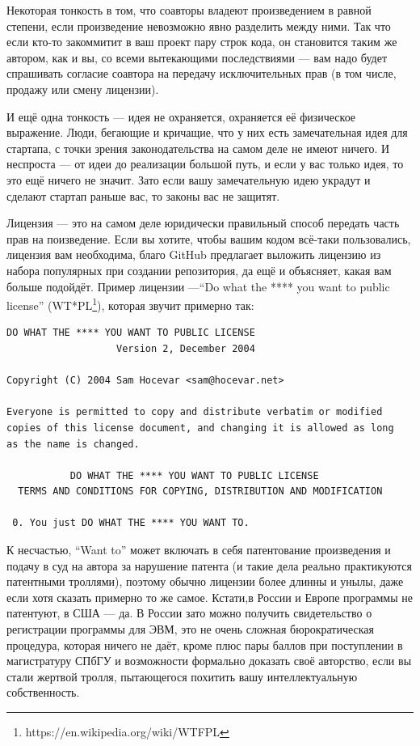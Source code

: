 \documentclass[a5paper]{article}
\begin{document}
Некоторая тонкость в том, что соавторы владеют произведением в равной степени, если произведение невозможно явно разделить между ними. Так что если кто-то закоммитит в ваш проект пару строк кода, он становится таким же автором, как и вы, со всеми вытекающими последствиями --- вам надо будет спрашивать согласие соавтора на передачу исключительных прав (в том числе, продажу или смену лицензии).

И ещё одна тонкость --- идея не охраняется, охраняется её физическое выражение. Люди, бегающие и кричащие, что у них есть замечательная идея для стартапа, с точки зрения законодательства на самом деле не имеют ничего. И неспроста --- от идеи до реализации большой путь, и если у вас только идея, то это ещё ничего не значит. Зато если вашу замечательную идею украдут и сделают стартап раньше вас, то законы вас не защитят.

Лицензия --- это на самом деле юридически правильный способ передать часть прав на поизведение. Если вы хотите, чтобы вашим кодом всё-таки пользовались, лицензия вам необходима, благо GitHub предлагает выложить лицензию из набора популярных при создании репозитория, да ещё и объясняет, какая вам больше подойдёт. Пример лицензии ---``Do what the **** you want to public license'' (WT*PL\footnote{https://en.wikipedia.org/wiki/WTFPL}), которая звучит примерно так:
\begin{verbatim}
DO WHAT THE **** YOU WANT TO PUBLIC LICENSE
                   Version 2, December 2004
 
Copyright (C) 2004 Sam Hocevar <sam@hocevar.net>

Everyone is permitted to copy and distribute verbatim or modified
copies of this license document, and changing it is allowed as long
as the name is changed.
 
           DO WHAT THE **** YOU WANT TO PUBLIC LICENSE
  TERMS AND CONDITIONS FOR COPYING, DISTRIBUTION AND MODIFICATION

 0. You just DO WHAT THE **** YOU WANT TO.
 \end{verbatim}

К несчастью, ``Want to'' может включать в себя патентование произведения и подачу в суд на автора за нарушение патента (и такие дела реально практикуются патентными троллями), поэтому обычно лицензии более длинны и унылы, даже если хотя сказать примерно то же самое. Кстати,в России и Европе программы не патентуют, в США --- да. В России зато можно получить свидетельство о регистрации программы для ЭВМ, это не очень сложная бюрократическая процедура, которая ничего не даёт, кроме плюс пары баллов при поступлении в магистратуру СПбГУ и возможности формально доказать своё авторство, если вы стали жертвой тролля, пытающегося похитить вашу интеллектуальную собственность.
\end{document}
